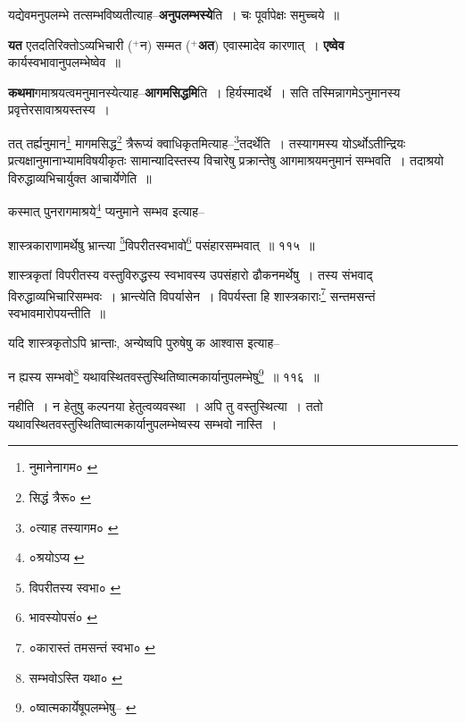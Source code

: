 \documentclass[article,12pt,a4paper]{memoir}
\newcommand{\add}[1]{($^{+}$#1)}
\begin{document}
	  \pstart यद्येवमनुपलम्भे तत्सम्भविष्यतीत्याह--\textbf{अनुपलम्भस्ये}ति । चः पूर्वापेक्षः समुच्चये ॥
	\pend
      

	  \pstart \textbf{यत} एतदतिरिक्तोऽव्यभिचारी \add{न} सम्मत \add{\textbf{अत}} एवास्मादेव कारणात् । \textbf{एष्वेव} कार्यस्वभावानुपलम्भेष्वेव ॥
	\pend
      

	  \pstart \textbf{कथमा}गमाश्रयत्वमनुमानस्येत्याह--\textbf{आगमसिद्धमि}ति । हिर्यस्मादर्थे । सति तस्मिन्नागमेऽनुमानस्य प्रवृत्तेरसावाश्रयस्तस्य ।
	\pend
	  \bigskip
	  \begingroup
	

	  \pstart तत् तर्ह्यनुमान\footnote{नुमानेनागम० \cite{dp-msA} \cite{dp-msB} \cite{dp-edP} \cite{dp-edH}} मागमसिद्ध\footnote{सिद्धं त्रैरू० \cite{dp-msC}} त्रैरूप्यं क्वाधिकृतमित्याह--\footnote{०त्याह तस्यागम० \cite{dp-msB}}\-तदर्थेति । तस्यागमस्य योऽर्थोऽतीन्द्रियः प्रत्यक्षानुमानाभ्यामविषयीकृतः सामान्यादिस्तस्य विचारेषु प्रक्रान्तेषु आगमाश्रयमनुमानं सम्भवति । तदाश्रयो विरुद्धाव्यभिचार्युक्त आचार्येणेति ॥
	\pend
       

	  \pstart कस्मात् पुनरागमाश्रये\footnote{०श्रयोऽप्य \cite{dp-msA}} प्यनुमाने सम्भव इत्याह--
	\pend
       
	  \bigskip
	  \begingroup
	

	  \pstart शास्त्रकाराणामर्थेषु भ्रान्त्या \footnote{विपरीतस्य स्वभा० \cite{dp-msB} \cite{dp-edP} \cite{dp-edH} \cite{dp-edE}}\-विपरीतस्वभावो\footnote{भावस्योपसं० \cite{dp-edN}} पसंहारसम्भवात् ॥ ११५ ॥
	\pend
      
	  \endgroup
	 

	  \pstart शास्त्रकृतां विपरीतस्य वस्तुविरुद्धस्य स्वभावस्य उपसंहारो ढौकनमर्थेषु । तस्य संभवाद् विरुद्धाव्यभिचारिसम्भवः । भ्रान्त्येति विपर्यासेन । विपर्यस्ता हि शास्त्रकाराः\footnote{०कारास्तं तमसन्तं स्वभा० \cite{dp-edE}} सन्तमसन्तं स्वभावमारोपयन्तीति ॥
	\pend
       

	  \pstart यदि शास्त्रकृतोऽपि भ्रान्ताः, अन्येष्वपि पुरुषेषु क आश्वास इत्याह--
	\pend
       
	  \bigskip
	  \begingroup
	

	  \pstart न ह्यस्य सम्भवो\footnote{सम्भवोऽस्ति यथा० \cite{dp-msC}} यथावस्थितवस्तुस्थितिष्वात्मकार्यानुपलम्भेषु\footnote{०ष्वात्मकार्येषूपलम्भेषु--\cite{dp-msB} \cite{dp-edP} \cite{dp-edH}} ॥ ११६ ॥
	\pend
      
	  \endgroup
	 

	  \pstart नहीति । न हेतुषु कल्पनया हेतुत्वव्यवस्था । अपि तु वस्तुस्थित्या । ततो यथावस्थितवस्तुस्थितिष्वात्मकार्यानुपलम्भेष्वस्य सम्भवो नास्ति ।
	\pend
       
\end{document}
